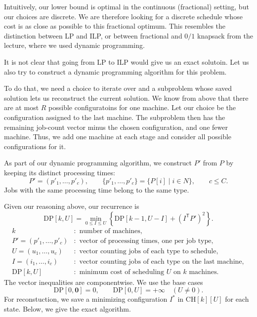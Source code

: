 \documentclass[12pt,a4paper]{article}
\begin{document}
Intuitively, our lower bound is optimal in the continuous (fractional)
setting, but our choices are discrete. We are therefore looking for a
discrete schedule whose cost is as close as possible to this fractional
optimum. This resembles the distinction between LP and ILP, or between
fractional and $0/1$ knapsack from the lecture, where we used dynamic
programming.

It is not clear that going from LP to ILP would give us an exact solutoin.
Let us also try to construct a dynamic programming algorithm for this problem.

To do that, we need a choice to iterate over and a subproblem whose saved
solution lets us reconstruct the current solution. We know from above that
there are at most $R$ possible configuratoins for one machine. Let our
choice be the configuration assigned to the last machine. The subproblem
then has the remaining job-count vector minus the chosen configuration,
and one fewer machine. Thus, we add one machine at each stage and consider
all possible configurations for it.

As part of our dynamic programming algorithm, we construct $P'$ from $P$
by keeping its distinct processing times:
\[
P'=(p'_1,\ldots,p'_c),\qquad
\{p'_1,\ldots,p'_c\}=\{P[i]\mid i\in N\},\qquad c\leq C.
\]
Jobs with the same processing time belong to the same type.

Given our reasoning above, our recurrence is
\[
\mathrm{DP}[k,U]
=\min_{0\leq I\leq U}
\left\{
\mathrm{DP}[k-1,U-I]
+(I^{\mathsf T}P')^2
\right\}.
\]
\[
\begin{aligned}
k &:\text{ number of machines},\\
P'=(p'_1,\ldots,p'_c) &:\text{ vector of processing times, one per job type},\\
U=(u_1,\ldots,u_c) &:\text{ vector counting jobs of each type to schedule},\\
I=(i_1,\ldots,i_c) &:\text{ vector counting jobs of each type on the last machine},\\
\mathrm{DP}[k,U] &:\text{ minimum cost of scheduling }U
\text{ on }k\text{ machines}.
\end{aligned}
\]
The vector inequalities are componentwise. We use the base cases
\[
\mathrm{DP}[0,\mathbf{0}]=0,\qquad
\mathrm{DP}[0,U]=+\infty\quad(U\neq0).
\]
For reconstuction, we save a minimizing configuration $I^*$ in
$\mathrm{CH}[k][U]$ for each state.
Below, we give the exact algorithm.
\end{document}
